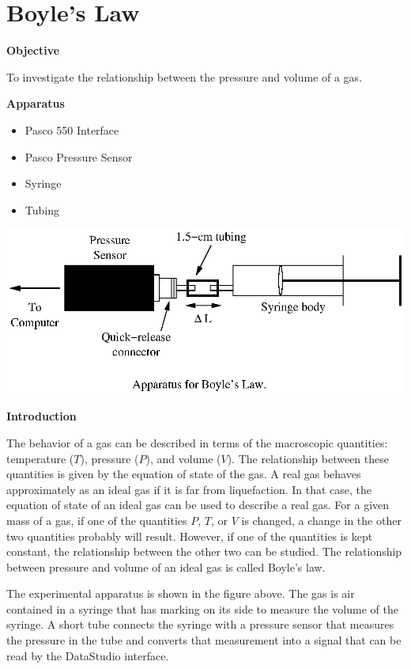 
\section{Boyle's Law}

\makelabheader %

\textbf{Objective}

To investigate the relationship between the pressure and volume of
a gas.

\textbf{Apparatus}

\begin{itemize}
\item Pasco 550 Interface
\item Pasco Pressure Sensor
\item Syringe
\item Tubing
\end{itemize}
\vspace{0.3cm}
{\par\centering \includegraphics{boyles_law/boyleslawfig1.eps} \par}
\vspace{0.3cm}

\textbf{Introduction}

The behavior of a gas can be described in terms of the macroscopic quantities:
temperature ($T$), pressure ($P$), and volume ($V$). The relationship between these
quantities is given by the equation of state of the gas. A real gas behaves
approximately as an ideal gas if it is far from liquefaction. In that case,
the equation of state of an ideal gas can be used to describe a real gas. For
a given mass of a gas, if one of the quantities $P$, $T$, or $V$ is changed, a change
in the other two quantities probably will result. However, if one of the quantities
is kept constant, the relationship between the other two can be studied. The
relationship between pressure and volume of an ideal gas is called Boyle's law.

The experimental apparatus is shown in the figure above. The gas is air contained
in a syringe that has marking on its side to measure the volume of the syringe.
A short tube connects the syringe with a pressure sensor that measures the pressure
in the tube and converts that measurement into a signal that can be read by
the DataStudio interface.

